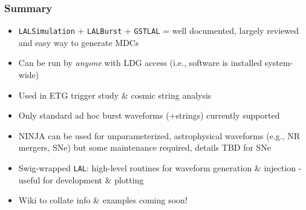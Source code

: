 \documentclass{beamer}
\begin{document}
\begin{frame}
    \frametitle{Summary}
    \begin{itemize}
        \item {\tt LALSimulation} + {\tt LALBurst} + {\tt GSTLAL} =  well
            documented, largely reviewed and easy way to generate MDCs
        \item Can be run by \emph{anyone} with LDG access (i.e., software is
            installed system-wide)
        \item Used in ETG trigger study \& cosmic string analysis
        \item Only standard ad hoc burst waveforms (+strings) currently supported
        \item NINJA can be used for unparameterized, astrophysical waveforms
            (e.g., NR mergers, SNe) but some maintenance required, details TBD
            for SNe
        \item Swig-wrapped {\tt LAL}: high-level routines for waveform
            generation \& injection - useful for development \& plotting
        \item Wiki to collate info \& examples coming soon!
    \end{itemize}
\end{frame}
\end{document}
